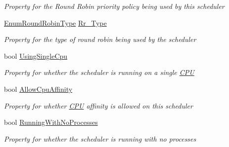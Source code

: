 \begin{DoxyCompactItemize}
\begin{DoxyCompactList}\small\item\em Property for the Round Robin priority policy being used by this scheduler \end{DoxyCompactList}\item 
\hyperlink{namespace_c_p_u___o_s___simulator_1_1_operating___system_a4c7effb8b6725df52018a3a14cede96e}{Enum\+Round\+Robin\+Type} \hyperlink{class_c_p_u___o_s___simulator_1_1_operating___system_1_1_scheduler_acc7c4b6c0383e4cf1a65251335f44e6d}{Rr\+\_\+\+Type}
\begin{DoxyCompactList}\small\item\em Property for the type of round robin being used by the scheduler \end{DoxyCompactList}\item 
bool \hyperlink{class_c_p_u___o_s___simulator_1_1_operating___system_1_1_scheduler_a3637999160bc25da430731042f42dd81}{Using\+Single\+Cpu}
\begin{DoxyCompactList}\small\item\em Property for whether the scheduler is running on a single \hyperlink{namespace_c_p_u___o_s___simulator_1_1_c_p_u}{C\+P\+U} \end{DoxyCompactList}\item 
bool \hyperlink{class_c_p_u___o_s___simulator_1_1_operating___system_1_1_scheduler_a904a19345a3ceffa809aac3e0ad06321}{Allow\+Cpu\+Affinity}
\begin{DoxyCompactList}\small\item\em Property for whether \hyperlink{namespace_c_p_u___o_s___simulator_1_1_c_p_u}{C\+P\+U} affinity is allowed on this scheduler \end{DoxyCompactList}\item 
bool \hyperlink{class_c_p_u___o_s___simulator_1_1_operating___system_1_1_scheduler_a17ad8e2a5da8823a25da6fa4190f532d}{Running\+With\+No\+Processes}
\begin{DoxyCompactList}\small\item\em Property for whether the scheduler is running with no processes \end{DoxyCompactList}\end{DoxyCompactItemize}
